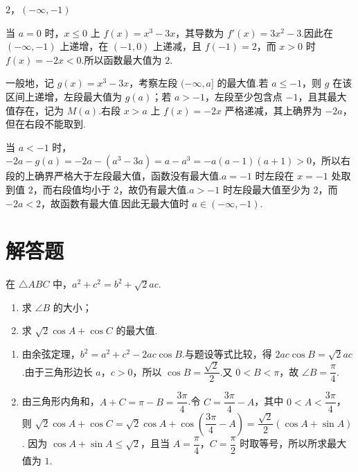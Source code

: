 \begin{answer}
\(2\)，\((-\infty,-1)\)
\end{answer}

\begin{solution}
当 \(a=0\) 时，\(x\le0\) 上 \(f(x)=x^3-3x\)，其导数为 \(f'(x)=3x^2-3\).因此在 \((-\infty,-1)\) 上递增，在 \((-1,0)\) 上递减，且 \(f(-1)=2\)，而 \(x>0\) 时 \(f(x)=-2x<0\).所以函数最大值为 \(2\).

一般地，记 \(g(x)=x^3-3x\)，考察左段 \((-\infty,a]\) 的最大值.若 \(a\le-1\)，则 \(g\) 在该区间上递增，左段最大值为 \(g(a)\)；若 \(a>-1\)，左段至少包含点 \(-1\)，且其最大值存在，记为 \(M(a)\).右段 \(x>a\) 上 \(f(x)=-2x\) 严格递减，其上确界为 \(-2a\)，但在右段不能取到.

当 \(a<-1\) 时，\(-2a-g(a)=-2a-(a^3-3a)=a-a^3=-a(a-1)(a+1)>0\)，所以右段的上确界严格大于左段最大值，函数没有最大值.\(a=-1\) 时左段在 \(x=-1\) 处取到值 \(2\)，而右段值均小于 \(2\)，故仍有最大值.\(a>-1\) 时左段最大值至少为 \(2\)，而 \(-2a<2\)，故函数有最大值.因此无最大值时 \(a\in(-\infty,-1)\).
\end{solution}

\section{解答题}

\begin{problem}
在 \(\triangle ABC\) 中，\(a^2+c^2=b^2+\sqrt{2}ac\).

\begin{enumerate}
\item 求 \(\angle B\) 的大小；
\item 求 \(\sqrt{2}\cos A+\cos C\) 的最大值.
\end{enumerate}
\end{problem}

\begin{solution}
\begin{enumerate}
\item 由余弦定理，\(b^2=a^2+c^2-2ac\cos B\).与题设等式比较，得 \(2ac\cos B=\sqrt2ac\).由于三角形边长 \(a\)，\(c>0\)，所以 \(\cos B=\dfrac{\sqrt2}{2}\).又 \(0<B<\pi\)，故 \(\angle B=\dfrac\pi4\).
\item 由三角形内角和，\(A+C=\pi-B=\dfrac{3\pi}{4}\).令 \(C=\dfrac{3\pi}{4}-A\)，其中 \(0<A<\dfrac{3\pi}{4}\)，则
\(\sqrt2\cos A+\cos C=\sqrt2\cos A+\cos\left(\dfrac{3\pi}{4}-A\right)=\dfrac{\sqrt2}{2}(\cos A+\sin A)\).
因为 \(\cos A+\sin A\le\sqrt2\)，且当 \(A=\dfrac\pi4\)，\(C=\dfrac\pi2\) 时取等号，所以所求最大值为 \(1\).
\end{enumerate}
\end{solution}

